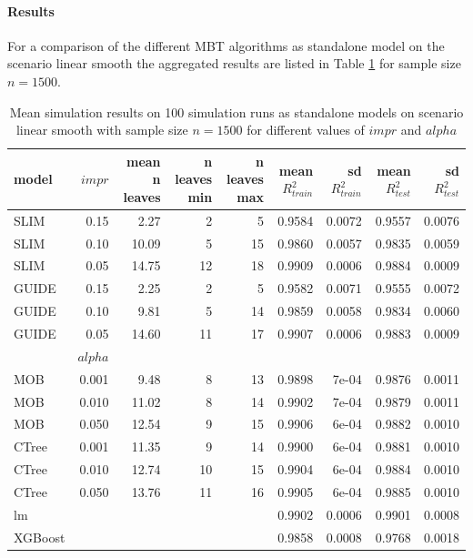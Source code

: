 \paragraph{Results}
For a comparison of the different MBT algorithms as standalone model on the scenario linear smooth the aggregated results are listed in Table \ref{tab:linear_smooth_summary} for sample size $n = 1500$. 

\begin{table}[!htb] 
\centering \tiny
\begin{tabular}[t]{l|r|r|r|r|r|r|r|r}
\hline
model & $impr$ & mean n leaves & n leaves min & n leaves max & mean $R^2_{train}$ & sd $R^2_{train}$ & mean $R^2_{test}$ & sd $R^2_{test}$\\
\hline
SLIM & 0.15 & 2.27 & 2 & 5 & 0.9584 & 0.0072 & 0.9557 & 0.0076\\
SLIM & 0.10 & 10.09 & 5 & 15 & 0.9860 & 0.0057 & 0.9835 & 0.0059\\
SLIM & 0.05 & 14.75 & 12 & 18 & 0.9909 & 0.0006 & 0.9884 & 0.0009\\
GUIDE & 0.15 & 2.25 & 2 & 5 & 0.9582 & 0.0071 & 0.9555 & 0.0072\\
GUIDE & 0.10 & 9.81 & 5 & 14 & 0.9859 & 0.0058 & 0.9834 & 0.0060\\
GUIDE & 0.05 & 14.60 & 11 & 17 & 0.9907 & 0.0006 & 0.9883 & 0.0009\\
\hline
 & $alpha$ &  &  &  &  &  &  & \\
\hline
MOB & 0.001 & 9.48 & 8 & 13 & 0.9898 & 7e-04 & 0.9876 & 0.0011\\
MOB & 0.010 & 11.02 & 8 & 14 & 0.9902 & 7e-04 & 0.9879 & 0.0011\\
MOB & 0.050 & 12.54 & 9 & 15 & 0.9906 & 6e-04 & 0.9882 & 0.0010\\
CTree & 0.001 & 11.35 & 9 & 14 & 0.9900 & 6e-04 & 0.9881 & 0.0010\\
CTree & 0.010 & 12.74 & 10 & 15 & 0.9904 & 6e-04 & 0.9884 & 0.0010\\
CTree & 0.050 & 13.76 & 11 & 16 & 0.9905 & 6e-04 & 0.9885 & 0.0010\\
\hline
lm & & & & & 0.9902 & 0.0006 & 0.9901 & 0.0008\\
XGBoost & & & & & 0.9858 & 0.0008 & 0.9768 & 0.0018\\
\hline
\end{tabular}
\caption{Mean simulation results on 100 simulation runs as standalone models on scenario linear smooth with sample size $n = 1500$ for different values of $impr$ and $alpha$}
\label{tab:linear_smooth_summary}
\end{table}


